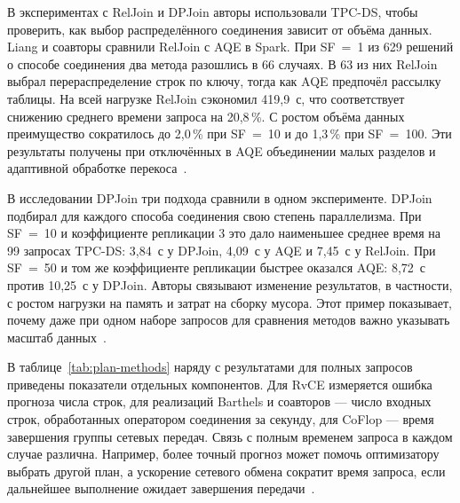 \documentclass[a4paper, final]{article}
\begin{document}
	В экспериментах с RelJoin и DPJoin авторы использовали TPC-DS, чтобы проверить, как выбор распределённого соединения зависит от объёма данных. Liang и соавторы сравнили RelJoin с AQE в Spark. При SF~=~1 из 629 решений о способе соединения два метода разошлись в 66 случаях. В 63 из них RelJoin выбрал перераспределение строк по ключу, тогда как AQE предпочёл рассылку таблицы. На всей нагрузке RelJoin сэкономил 419,9~с, что соответствует снижению среднего времени запроса на 20,8\,\%. С ростом объёма данных преимущество сократилось до 2,0\,\% при SF~=~10 и до 1,3\,\% при SF~=~100. Эти результаты получены при отключённых в AQE объединении малых разделов и адаптивной обработке перекоса~\cite{liang2024}.
	
	В исследовании DPJoin три подхода сравнили в одном эксперименте. DPJoin подбирал для каждого способа соединения свою степень параллелизма. При SF~=~10 и коэффициенте репликации 3 это дало наименьшее среднее время на 99 запросах TPC-DS: 3,84~с у DPJoin, 4,09~с у AQE и 7,45~с у RelJoin. При SF~=~50 и том же коэффициенте репликации быстрее оказался AQE: 8,72~с против 10,25~с у DPJoin. Авторы связывают изменение результатов, в частности, с ростом нагрузки на память и затрат на сборку мусора. Этот пример показывает, почему даже при одном наборе запросов для сравнения методов важно указывать масштаб данных~\cite{turkmen2026}.
	
	В таблице~\ref{tab:plan-methods} наряду с результатами для полных запросов приведены показатели отдельных компонентов. Для RvCE измеряется ошибка прогноза числа строк, для реализаций Barthels и соавторов --- число входных строк, обработанных оператором соединения за секунду, для CoFlop --- время завершения группы сетевых передач. Связь с полным временем запроса в каждом случае различна. Например, более точный прогноз может помочь оптимизатору выбрать другой план, а ускорение сетевого обмена сократит время запроса, если дальнейшее выполнение ожидает завершения передачи~\cite{wang2024,barthels2017,coflop2023}.
	
\end{document}
